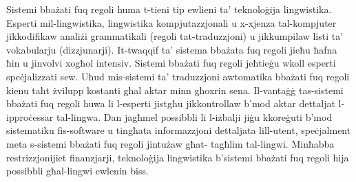 \documentclass[]{../../metanetpaper}
\begin{document}
\begin{multicols}{2}
   
Sistemi bbażati fuq regoli huma t-tieni tip ewlieni ta’ teknoloġija lingwistika. Esperti mil-lingwistika, lingwistika kompjutazzjonali u x-xjenza tal-kompjuter jikkodifikaw analiżi grammatikali (regoli tat-traduzzjoni) u jikkumpilaw listi ta’ vokabularju (dizzjunarji). It-twaqqif ta’ sistema bbażata fuq regoli jieħu ħafna ħin u jinvolvi xogħol intensiv. Sistemi bbażati fuq regoli jeħtieġu wkoll esperti speċjalizzati sew. Uħud mis-sistemi ta’ traduzzjoni awtomatika bbażati fuq regoli kienu taħt żvilupp kostanti għal aktar minn għoxrin sena. Il-vantaġġ tas-sistemi bbażati fuq regoli huwa li l-esperti jistgħu jikkontrollaw b’mod aktar dettaljat l-ipproċessar tal-lingwa. Dan jagħmel possibbli li l-iżbalji jiġu kkoreġuti b’mod sistematiku fis-software u tingħata informazzjoni dettaljata lill-utent, speċjalment meta s-sistemi bbażati fuq regoli jintużaw għat- tagħlim tal-lingwi. Minħabba restrizzjonijiet finanzjarji, teknoloġija lingwistika b’sistemi bbażati fuq regoli hija possibbli għal-lingwi ewlenin biss.
\end{multicols}

\clearpage


 \cite{Fabri1mt} 
\end{document}
